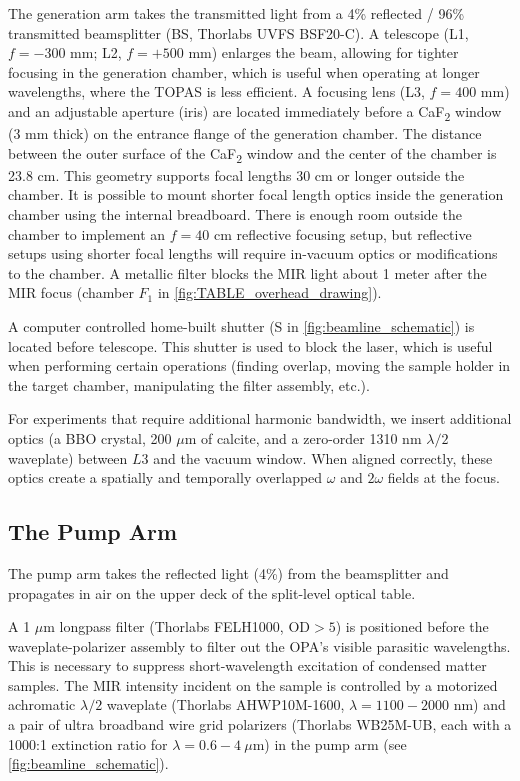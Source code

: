 The generation arm takes the transmitted light from a 4\% reflected / 96\% transmitted beamsplitter (BS, Thorlabs UVFS BSF20-C). A telescope (L1, $f = - 300$ mm; L2, $f = + 500$ mm) enlarges the beam, allowing for tighter focusing in the generation chamber, which is useful when operating at longer wavelengths, where the TOPAS is less efficient. A focusing lens (L3, $f= 400$ mm) and an adjustable aperture (iris) are located immediately before a CaF\textsubscript{2} window (3 mm thick) on the entrance flange of the generation chamber. The distance between the outer surface of the CaF\textsubscript{2} window and the center of the chamber is 23.8 cm. This geometry supports focal lengths 30 cm or longer outside the chamber. It is possible to mount shorter focal length optics inside the generation chamber using the internal breadboard. There is enough room outside the chamber to implement an $f = 40$ cm reflective focusing setup, but reflective setups using shorter focal lengths will require in-vacuum optics or modifications to the chamber. A metallic filter blocks the MIR light about 1 meter after the MIR focus (chamber $F_1$ in \cref{fig:TABLE_overhead_drawing}).

A computer controlled home-built shutter (S in \cref{fig:beamline_schematic}) is located before telescope. This shutter is used to block the laser, which is useful when performing certain operations (finding overlap, moving the sample holder in the target chamber, manipulating the filter assembly, etc.).

For experiments that require additional harmonic bandwidth, we insert additional optics (a BBO crystal, 200 $\mu$m of calcite, and a zero-order 1310 nm $\lambda/2$ waveplate) between $L3$ and the vacuum window. When aligned correctly, these optics create a spatially and temporally overlapped $\omega$ and $2\omega$ fields at the focus.

\subsection{The Pump Arm}

The pump arm takes the reflected light (4\%) from the beamsplitter and propagates in air on the upper deck of the split-level optical table.

A 1 $\mu$m longpass filter (Thorlabs FELH1000, $\text{OD}>5$) is positioned before the waveplate-polarizer assembly to filter out the OPA's visible parasitic wavelengths. This is necessary to suppress short-wavelength excitation of condensed matter samples. The MIR intensity incident on the sample is controlled by a motorized achromatic $\lambda/2$ waveplate (Thorlabs AHWP10M-1600, $\lambda = 1100 - 2000$ nm) and a pair of ultra broadband wire grid polarizers (Thorlabs WB25M-UB, each with a 1000:1 extinction ratio for $\lambda = 0.6 - 4 \ \mu \text{m}$) in the pump arm (see \cref{fig:beamline_schematic}). 

